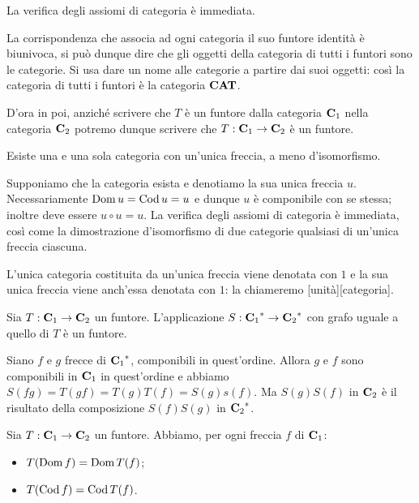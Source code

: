\Proof La verifica degli assiomi di categoria \`e immediata. \EndProof
\par La corrispondenza che associa ad ogni categoria il suo funtore identit\`a \`e biunivoca, si pu\`o dunque dire che gli oggetti della categoria di tutti i funtori sono le categorie. Si usa dare un nome alle categorie a partire dai suoi oggetti: cos\`i la categoria di tutti i funtori \`e la categoria $\mathbf{CAT}$.
\par D'ora in poi, anzich\'e scrivere che $T$ \`e un funtore dalla categoria $\mathbf{C}_1$ nella categoria $\mathbf{C}_2$ potremo dunque scrivere che $T: \mathbf{C}_1 \rightarrow \mathbf{C}_2$ \`e un funtore.
\begin{Theorem}
	Esiste una e una sola categoria con un'unica freccia, a meno d'isomorfismo.
\end{Theorem}
\Proof Supponiamo che la categoria esista e denotiamo la sua unica freccia $u$. Necessariamente $\operatorname{Dom} u = \operatorname{Cod} u = u$ e dunque $u$ \`e componibile con se stessa; inoltre deve essere $u \circ u = u$. La verifica degli assiomi di categoria \`e immediata, cos\`i come la dimostrazione d'isomorfismo di due categorie qualsiasi di un'unica freccia ciascuna. \EndProof
\begin{Definition}
	L'unica categoria costituita da un'unica freccia viene denotata con $1$ e la sua unica freccia viene anch'essa denotata con $1$: la chiameremo [unit\`a][categoria].
\end{Definition}
\begin{Theorem}
	Sia $T: \mathbf{C}_1 \rightarrow \mathbf{C}_2$ un funtore. L'applicazione $S: {{\mathbf{C}_1}^*} \rightarrow{{\mathbf{C}_2}^*}$ con grafo uguale a quello di $T$ \`e un funtore.
\end{Theorem}
\Proof Siano $f$ e $g$ frecce di ${{\mathbf{C}_1}^*}$, componibili in quest'ordine. Allora $g$ e $f$ sono componibili in $\mathbf{C}_1$ in quest'ordine e abbiamo $S(fg) = T(gf) = T(g)T(f) = S(g)s(f)$. Ma $S(g)S(f)$ in $\mathbf{C}_2$ \`e il risultato della composizione $S(f)S(g)$ in ${{\mathbf{C}_2}^*}$. \EndProof
\begin{Theorem}
	Sia $T: \mathbf{C}_1 \rightarrow \mathbf{C}_2$ un funtore. Abbiamo, per ogni freccia $f$ di $\mathbf{C}_1$:
	\begin{itemize}
		\item $T(\operatorname{Dom} f) = \operatorname{Dom} T(f)$;
		\item $T(\operatorname{Cod} f) = \operatorname{Cod} T(f)$.
	\end{itemize}
\end{Theorem}
